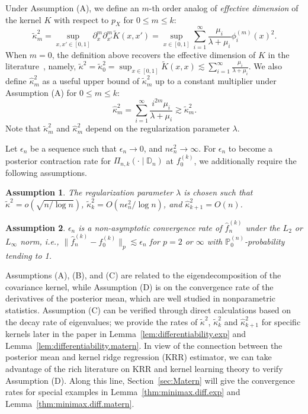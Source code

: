 \documentclass[12pt]{article}
\newcommand\data{\mathbb{D}_n}
\newcommand{\PP}{\mathbb{P}}
\newcommand{\s}{\sum_{i=1}^{\infty}}
\theoremstyle{plain}
\newtheorem{assumption}{Assumption}
\renewcommand{\theassumption}{A}
\theoremstyle{nonitalicremark}
\begin{document}
Under Assumption (A), we define an $m$-th order analog of \textit{effective dimension} of the kernel $K$ with respect to $p_X$ for $0\leq m\leq k$:
\begin{equation}\label{eq:high.order.kappa}
\tilde{\kappa}_{m}^2=\sup_{x,x'\in[0,1]}\partial_{x}^m\partial_{x'}^m\tilde{K}(x,x')=\sup_{x\in[0,1]}\s\frac{\mu_i}{\lambda+\mu_i}\phi^{(m)}_i(x)^2.
\end{equation}
When $m = 0$, the definition above recovers the effective dimension of $K$ in the literature~\citep{zhang2005learning}, namely,  $\tilde{\kappa}^2=\tilde{\kappa}_{0}^2 =\sup_{x\in [0,1]}\tilde{K}(x,x) \lesssim\sum_{i=1}^{\infty}\frac{\mu_i}{\lambda+\mu_i}$.
We also define $\hat{\kappa}_{m}^2$ as a useful upper bound of $\tilde{\kappa}_{m}^2$ up to a constant multiplier under Assumption (A) for $0 \leq m\leq k$:
\begin{equation}\label{eq:kappa.k+1}
\hat{\kappa}_{m}^2=\s\frac{i^{2m}\mu_i}{\lambda+\mu_i}\gtrsim \tilde\kappa_{m}^2.
\end{equation}
Note that $\tilde\kappa_{m}^2$ and $\hat\kappa_{m}^2$ depend on the regularization parameter $\lambda$.

Let $\epsilon_n$ be a sequence such that $\epsilon_n\rightarrow0$, and $n\epsilon_n^2\rightarrow\infty$. For $\epsilon_n$ to become a posterior contraction rate for $\Pi_{n,k}(\cdot\mid\data)$ at $f_0^{(k)}$, we additionally require the following assumptions.

\renewcommand{\theassumption}{(C)}

\begin{assumption}
The regularization parameter $\lambda$ is chosen such that $\tilde{\kappa}^2=o(\sqrt{n/\log n})$, $\tilde{\kappa}_{k}^2=O(n\epsilon_n^2/\log n)$, and $\hat{\kappa}_{k+1}^2=O(n)$.
\end{assumption}

\renewcommand{\theassumption}{(D)}

\begin{assumption}
$\epsilon_n$ is a non-asymptotic convergence rate of $\hat{f}_n^{(k)}$ under the $L_2$ or $L_\infty$ norm, i.e., $\|\hat f_n^{(k)}-f_0^{(k)}\|_p\lesssim \epsilon_n$ for $p = 2$ or $\infty$ with $\PP_0^{(n)}$-probability tending to 1.
\end{assumption}

Assumptions (A), (B), and (C) are related to the eigendecomposition of the covariance kernel, while Assumption (D) is on the convergence rate of the derivatives of the posterior mean, which are well studied in nonparametric statistics. Assumption (C) can be verified through direct calculations based on the decay rate of eigenvalues; we provide the rates of $\tilde{\kappa}^2$, $\tilde{\kappa}_{k}^2$ and $\hat{\kappa}_{k+1}^2$ for specific kernels later in the paper in Lemma~\ref{lem:differentiability.exp} and Lemma~\ref{lem:differentiability.matern}. In view of the connection between the posterior mean and kernel ridge regression (KRR) estimator, we can take advantage of the rich literature on KRR and kernel learning theory to verify Assumption (D). Along this line, Section~\ref{sec:Matern} will give the convergence rates for special examples in Lemma~\ref{thm:minimax.diff.exp} and Lemma~\ref{thm:minimax.diff.matern}. 
\end{document}
